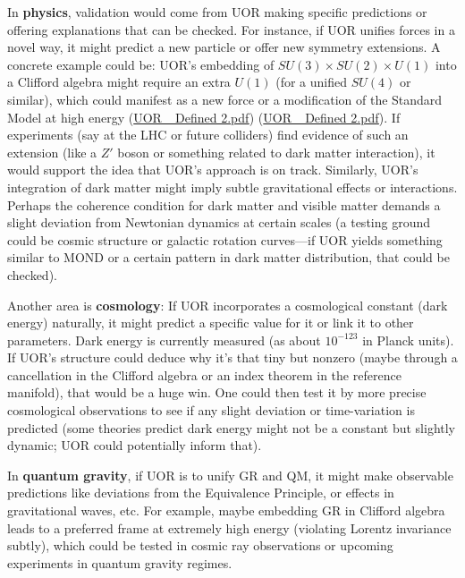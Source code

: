 \documentclass[12pt]{article}
\begin{document}
In \textbf{physics}, validation would come from UOR making specific predictions or offering explanations that can be checked. For instance, if UOR unifies forces in a novel way, it might predict a new particle or offer new symmetry extensions. A concrete example could be: UOR’s embedding of $SU(3)\times SU(2)\times U(1)$ into a Clifford algebra might require an extra $U(1)$ (for a unified $SU(4)$ or similar), which could manifest as a new force or a modification of the Standard Model at high energy (\href{file://file-TBF3nHDaRR5QeVMmwCFYkp#:~:text=which%20in%20turn%20contains%20subgroups,Within%20UOR%2C%20one%20could%20let}{UOR\_ Defined 2.pdf}) (\href{file://file-TBF3nHDaRR5QeVMmwCFYkp#:~:text=Cosmo%20Const%20Proof%20Supp1,Such%20an%20approach%20aligns%20with}{UOR\_ Defined 2.pdf}). If experiments (say at the LHC or future colliders) find evidence of such an extension (like a $Z'$ boson or something related to dark matter interaction), it would support the idea that UOR’s approach is on track. Similarly, UOR’s integration of dark matter might imply subtle gravitational effects or interactions. Perhaps the coherence condition for dark matter and visible matter demands a slight deviation from Newtonian dynamics at certain scales (a testing ground could be cosmic structure or galactic rotation curves---if UOR yields something similar to MOND or a certain pattern in dark matter distribution, that could be checked).

\medskip

Another area is \textbf{cosmology}: If UOR incorporates a cosmological constant (dark energy) naturally, it might predict a specific value for it or link it to other parameters. Dark energy is currently measured (as about $10^{-123}$ in Planck units). If UOR’s structure could deduce why it’s that tiny but nonzero (maybe through a cancellation in the Clifford algebra or an index theorem in the reference manifold), that would be a huge win. One could then test it by more precise cosmological observations to see if any slight deviation or time-variation is predicted (some theories predict dark energy might not be a constant but slightly dynamic; UOR could potentially inform that).

\medskip

In \textbf{quantum gravity}, if UOR is to unify GR and QM, it might make observable predictions like deviations from the Equivalence Principle, or effects in gravitational waves, etc. For example, maybe embedding GR in Clifford algebra leads to a preferred frame at extremely high energy (violating Lorentz invariance subtly), which could be tested in cosmic ray observations or upcoming experiments in quantum gravity regimes.
\end{document}

